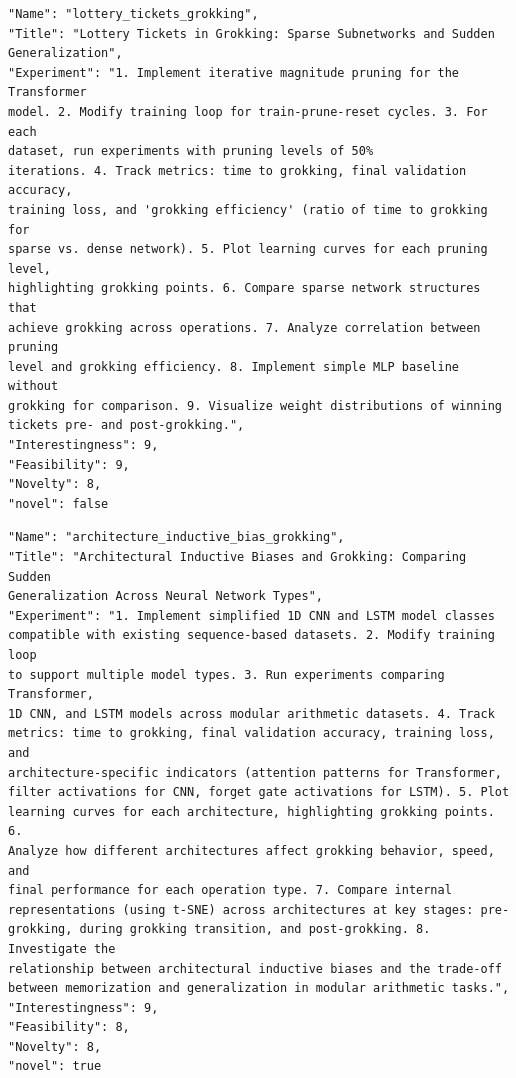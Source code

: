 \documentclass[11pt, a4paper]{include/gdm_format}
\begin{document}
\begin{tcolorbox}[breakable,colback=blue!5!white, colframe=blue!75!black, title=Idea 47/50 - \texttt{lottery\_tickets\_grokking}]
\small
\begin{verbatim}
"Name": "lottery_tickets_grokking",
"Title": "Lottery Tickets in Grokking: Sparse Subnetworks and Sudden
Generalization",
"Experiment": "1. Implement iterative magnitude pruning for the Transformer
model. 2. Modify training loop for train-prune-reset cycles. 3. For each
dataset, run experiments with pruning levels of 50%
iterations. 4. Track metrics: time to grokking, final validation accuracy,
training loss, and 'grokking efficiency' (ratio of time to grokking for
sparse vs. dense network). 5. Plot learning curves for each pruning level,
highlighting grokking points. 6. Compare sparse network structures that
achieve grokking across operations. 7. Analyze correlation between pruning
level and grokking efficiency. 8. Implement simple MLP baseline without
grokking for comparison. 9. Visualize weight distributions of winning
tickets pre- and post-grokking.",
"Interestingness": 9,
"Feasibility": 9,
"Novelty": 8,
"novel": false
\end{verbatim}
\end{tcolorbox}

\begin{tcolorbox}[breakable,colback=blue!5!white, colframe=blue!75!black, title=Idea 48/50 - \texttt{architecture\_inductive\_bias\_grokking}]
\small
\begin{verbatim}
"Name": "architecture_inductive_bias_grokking",
"Title": "Architectural Inductive Biases and Grokking: Comparing Sudden
Generalization Across Neural Network Types",
"Experiment": "1. Implement simplified 1D CNN and LSTM model classes
compatible with existing sequence-based datasets. 2. Modify training loop
to support multiple model types. 3. Run experiments comparing Transformer,
1D CNN, and LSTM models across modular arithmetic datasets. 4. Track
metrics: time to grokking, final validation accuracy, training loss, and
architecture-specific indicators (attention patterns for Transformer,
filter activations for CNN, forget gate activations for LSTM). 5. Plot
learning curves for each architecture, highlighting grokking points. 6.
Analyze how different architectures affect grokking behavior, speed, and
final performance for each operation type. 7. Compare internal
representations (using t-SNE) across architectures at key stages: pre-
grokking, during grokking transition, and post-grokking. 8. Investigate the
relationship between architectural inductive biases and the trade-off
between memorization and generalization in modular arithmetic tasks.",
"Interestingness": 9,
"Feasibility": 8,
"Novelty": 8,
"novel": true
\end{verbatim}
\end{tcolorbox}
\end{document}
